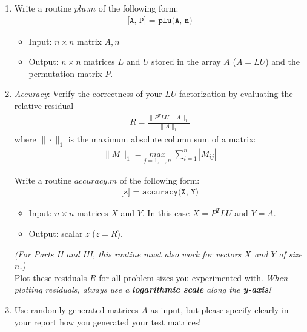 \documentclass{scrartcl}
\begin{document}
    \begin{enumerate}
        \item Write a routine $plu.m$ of the following form: 
        	\begin{align*}        	 
        		\texttt{[A, P] = plu(A, n)}
			\end{align*}
        	\begin{itemize}
            	\item Input: $n \times n$ matrix $A, n$
            	\item Output: $n \times n$ matrices $L$ and $U$ stored in the array $A$ ($A=LU$) and the permutation matrix $P$.
        	\end{itemize}           
    
        \item \textit{Accuracy}: Verify the correctness of your $LU$ factorization by evaluating the relative residual
        \begin{align*}
            R = \frac{\|P^TLU - A\|_{1}}{\|A\|_{1}}
        \end{align*}
        where $\|\cdot\|_{1}$ is the maximum absolute column sum of a matrix:
        \begin{align*}
            \|M\|_{1} = \underset{j = 1, \dots, n}{max} \; \sum_{i=1}^{n} |M_{ij}|
        \end{align*}

Write a routine $accuracy.m$ of the following form:
     	\begin{align*}
            	\texttt{[z] = accuracy(X, Y)}
        \end{align*}
		\begin{itemize}
            	\item Input: $n \times n$ matrices $X$ and $Y$. In this case $X = P^TLU$ and $Y = A$.
            	\item Output: scalar $z$ ($z = R$).
        \end{itemize}
		
		\textit{(For Parts II and III, this routine must also work for vectors $X$ and $Y$ of size $n$.)}\\
		
		

        Plot these residuals $R$ for all problem sizes you experimented with.
        \emph{When plotting residuals, always use a \textbf{logarithmic scale} along the \textbf{y-axis}!}
 
        
        \item Use randomly generated matrices $A$ as input, but please specify clearly in your report how you generated your test matrices!
      


\end{enumerate}
\end{document}
